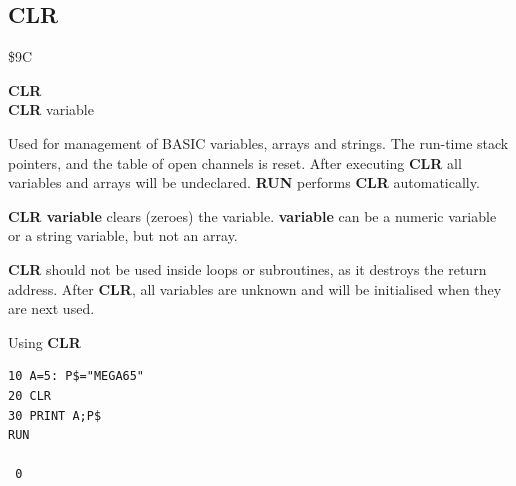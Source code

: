 \subsection{CLR}
\begin{description}[leftmargin=2cm,style=nextline]
\item [Token:] \$9C
\item [Format:] {\bf CLR} \\
                {\bf CLR} variable
\item [Usage:] Used for management of BASIC variables, arrays
               and strings. The run-time stack pointers,
               and the table of open channels is reset.
               After executing {\bf CLR} all variables and arrays will be undeclared.
               {\bf RUN} performs {\bf CLR} automatically.

               {\bf CLR variable} clears (zeroes) the variable.
               {\bf variable} can be a numeric variable or a string variable, but not
               an array.

\item [Remarks:] {\bf CLR} should not be used inside loops or
               subroutines, as it destroys the return address.
               After {\bf CLR}, all variables are unknown and will
               be initialised when they are next used.

\item [Example:] Using {\bf CLR}
\begin{tcolorbox}[colback=black,coltext=white]
\verbatimfont{\codefont}
\begin{verbatim}
10 A=5: P$="MEGA65"
20 CLR
30 PRINT A;P$
RUN

 0
\end{verbatim}
\end{tcolorbox}
\end{description}


\newpage
